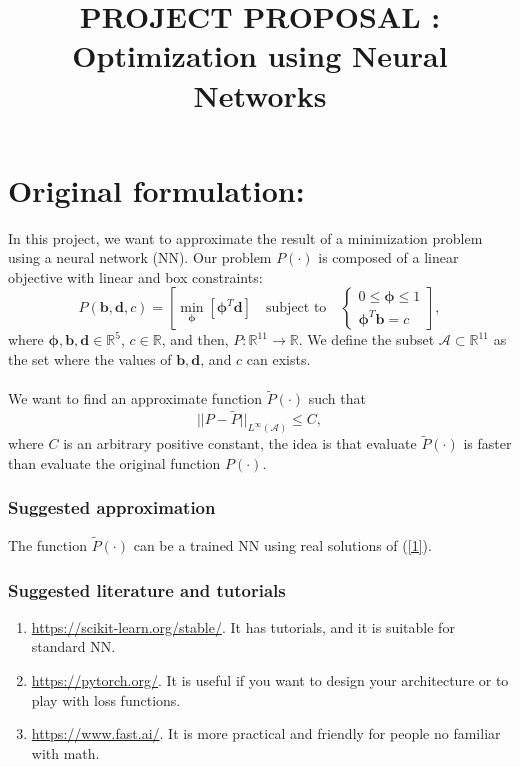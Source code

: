 \documentclass[12pt]{article}
\theoremstyle{definition}
\theoremstyle{remark}
\newcommand{\R}{\mathbb{R}}
\begin{document}
\title{PROJECT PROPOSAL	:\\
Optimization using Neural Networks}
\date{}
\maketitle

\section*{Original formulation:}

In this project, we want to approximate the result of a minimization problem using a neural network (NN). Our problem $P(\cdot)$ is composed of a linear objective with linear and box constraints:
\begin{equation}
P(\bm{b,d},c)=\left[\min_{\bm{\phi}}\left[\bm{\phi}^T\bm{d}\right]\quad\text{subject to}\quad\begin{cases}
0\leq\bm{\phi}\leq1\\
\bm{\phi}^T\bm{b}=c
\end{cases}\right],
\label{1}
\end{equation}
where $\bm{\phi,b,d}\in\R^5$, $c\in\R$, and then, $P:\R^{11}\to\R$. We define the subset $\mathcal{A}\subset\R^{11}$ as the set where the values of $\bm{b,d}$, and $c$ can exists.\\
\quad\\
We want to find an approximate function $\tilde{P}(\cdot)$ such that
\begin{equation*}
||P-\tilde{P}||_{L^{\infty}(\mathcal{A})}\leq C,
\end{equation*}
where $C$ is an arbitrary positive constant, the idea is that evaluate $\tilde{P}(\cdot)$ is faster than evaluate the original function $P(\cdot)$.

\subsubsection*{Suggested approximation}

The function $\tilde{P}(\cdot)$ can be a trained NN using real solutions of (\ref{1}).

\subsubsection*{Suggested literature and tutorials}

\begin{enumerate}

\item \url{https://scikit-learn.org/stable/}. {\color{blue} It has tutorials, and it is suitable for standard NN.}

\item \url{https://pytorch.org/}. {\color{blue} It is useful if you want to design your architecture or to play with loss functions.}

\item \url{https://www.fast.ai/}. {\color{blue} It is more practical and friendly for people no familiar with math.}

\end{enumerate}
\end{document}
